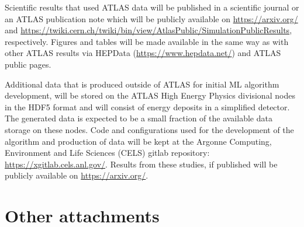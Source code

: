 \documentclass[letter, USenglish, 11pt, subfigure]{article}
\begin{document}
Scientific results that used ATLAS data will be published in a scientific journal or an ATLAS publication note which will be publicly available on \url{https://arxiv.org/} and \url{https://twiki.cern.ch/twiki/bin/view/AtlasPublic/SimulationPublicResults}, respectively. Figures and tables will be made available in the same way as with other ATLAS results via HEPData (\url{https://www.hepdata.net/}) and ATLAS public pages. 

Additional data that is produced outside of ATLAS for initial ML algorithm development, will be stored on the ATLAS High Energy Physics divisional nodes in the HDF5 format and will consist of energy deposits in a simplified detector. The generated data is expected to be a small fraction of the available data storage on these nodes. Code and configurations used for the development of the algorithm and production of data will be kept at the Argonne Computing, Environment and Life Sciences (CELS) gitlab repository: \url{https://xgitlab.cels.anl.gov/}. Results from these studies, if published will be publicly available on \url{https://arxiv.org/}. 

\clearpage

\section{Other attachments}
\end{document}
